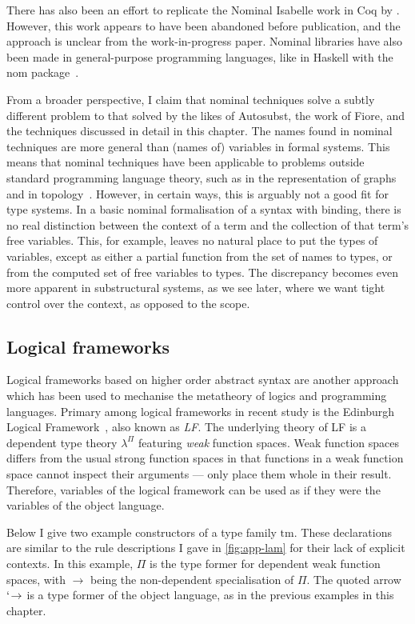 There has also been an effort to replicate the Nominal Isabelle work in Coq by
\citet{ABW06}.
However, this work appears to have been abandoned before publication, and the
approach is unclear from the work-in-progress paper.
Nominal libraries have also been made in general-purpose programming languages,
like in Haskell with the nom package~\citep{Gabbay20}.

From a broader perspective, I claim that nominal techniques solve a subtly
different problem to that solved by the likes of Autosubst, the work of Fiore,
and the techniques discussed in detail in this chapter.
The names found in nominal techniques are more general than (names of)
variables in formal systems.
This means that nominal techniques have been applicable to problems outside
standard programming language theory, such as in the representation of graphs
and in topology~\citep{GG17}.
However, in certain ways, this is arguably not a good fit for type systems.
In a basic nominal formalisation of a syntax with binding, there is no real
distinction between the context of a term and the collection of that term's free
variables.
This, for example, leaves no natural place to put the types of variables, except
as either a partial function from the set of names to types, or from the
computed set of free variables to types.
The discrepancy becomes even more apparent in substructural systems, as we see
later, where we want tight control over the context, as opposed to the scope.

\subsection{Logical frameworks}\label{sec:lf}

Logical frameworks based on higher order abstract syntax are another approach
which has been used to mechanise the metatheory of logics and programming
languages.
Primary among logical frameworks in recent study is the Edinburgh Logical
Framework~\citep{HHP93}, also known as \emph{LF}.
The underlying theory of LF is a dependent type theory $\lambda^\Pi$ featuring
\emph{weak} function spaces.
Weak function spaces differs from the usual strong function spaces in that
functions in a weak function space cannot inspect their arguments --- only
place them whole in their result.
Therefore, variables of the logical framework can be used as if they were the
variables of the object language.

Below I give two example constructors of a type family $\mathrm{tm}$.
These declarations are similar to the rule descriptions I gave in
\cref{fig:app-lam} for their lack of explicit contexts.
In this example, $\Pi$ is the type former for dependent weak function spaces,
with $\to$ being the non-dependent specialisation of $\Pi$.
The quoted arrow $\mathbin{`\!\to}$ is a type former of the object language, as in the
previous examples in this chapter.

